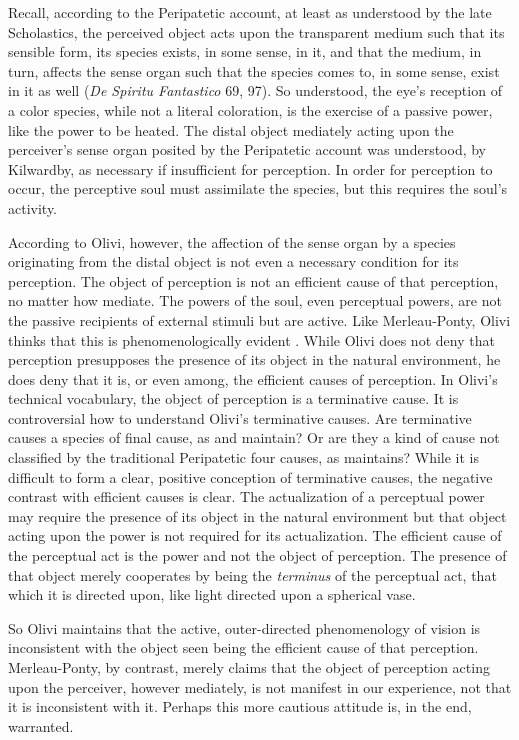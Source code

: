Recall, according to the Peripatetic account, at least as understood by the late Scholastics, the perceived object acts upon the transparent medium such that its sensible form, its species exists, in some sense, in it, and that the medium, in turn, affects the sense organ such that the species comes to, in some sense, exist in it as well (\emph{De Spiritu Fantastico} 69, 97). So understood, the eye's reception of a color species, while not a literal coloration, is the exercise of a passive power, like the power to be heated. The distal object mediately acting upon the perceiver's sense organ posited by the Peripatetic account was understood, by Kilwardby, as necessary if insufficient for perception. In order for perception to occur, the perceptive soul must assimilate the species, but this requires the soul's activity. 

According to Olivi, however, the affection of the sense organ by a species originating from the distal object is not even a necessary condition for its perception. The object of perception is not an efficient cause of that perception, no matter how mediate. The powers of the soul, even perceptual powers, are not the passive recipients of external stimuli but are active. Like Merleau-Ponty, Olivi thinks that this is phenomenologically evident \citep[143]{Toivanen:2013ul}. While Olivi does not deny that perception presupposes the presence of its object in the natural environment, he does deny that it is, or even among, the efficient causes of perception. In Olivi's technical vocabulary, the object of perception is a terminative cause. It is controversial how to understand Olivi's terminative causes. Are terminative causes a species of final cause, as \citet[192--195]{Kent:1984zm} and \citet{Pasnau:1999kn} maintain? Or are they a kind of cause not classified by the traditional Peripatetic four causes, as \citet[chapter 6]{Toivanen:2013ul} maintains? While it is difficult to form a clear, positive conception of terminative causes, the negative contrast with efficient causes is clear. The actualization of a perceptual power may require the presence of its object in the natural environment but that object acting upon the power is not required for its actualization. The efficient cause of the perceptual act is the power and not the object of perception. The presence of that object merely cooperates by being the \emph{terminus} of the perceptual act, that which it is directed upon, like light directed upon a spherical vase.

So Olivi maintains that the active, outer-directed phenomenology of vision is inconsistent with the object seen being the efficient cause of that perception. Merleau-Ponty, by contrast, merely claims that the object of perception acting upon the perceiver, however mediately, is not manifest in our experience, not that it is inconsistent with it. Perhaps this more cautious attitude is, in the end, warranted. 

